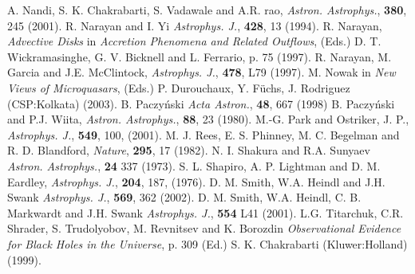 \documentclass{ws-procs975x65}
\begin{document}
\begin{thebibliography}{0}
\bibitem{} A. Nandi, S. K. Chakrabarti, S. Vadawale and A.R. rao, {\it Astron. Astrophys.}, {\bf 380}, 245 (2001).
\bibitem{} R. Narayan and I. Yi {\it Astrophys. J.}, {\bf 428}, 13 (1994).
\bibitem{} R. Narayan, {\it Advective Disks} in {\it Accretion Phenomena and Related Outflows}, (Eds.) D. T. Wickramasinghe, G. V. Bicknell and L. Ferrario, p. 75  (1997).
\bibitem{} R. Narayan, M. Garcia and J.E. McClintock, {\it Astrophys. J.}, {\bf 478}, L79 (1997).
\bibitem{} M. Nowak in {\it New Views of Microquasars}, (Eds.) P. Durouchaux, Y. F\"uchs, J. Rodriguez (CSP:Kolkata) (2003).
\bibitem{} B. Paczy\'nski {\it Acta Astron.}, {\bf 48}, 667 (1998)
\bibitem{} B. Paczy\'nski and P.J. Wiita, {\it Astron. Astrophys.}, {\bf 88}, 23 (1980).
\bibitem{} M.-G. Park and Ostriker, J. P.,  {\it Astrophys. J.}, {\bf 549}, 100, (2001).
\bibitem{} M. J. Rees, E. S. Phinney, M. C. Begelman and R. D. Blandford, {\it Nature}, {\bf 295}, 17 (1982).
\bibitem{} N. I. Shakura and R.A. Sunyaev {\it Astron. Astrophys.}, {\bf 24} 337 (1973).
\bibitem{} S. L. Shapiro, A. P. Lightman and D. M. Eardley,  {\it Astrophys. J.}, {\bf 204}, 187, (1976).
\bibitem{} D. M. Smith, W.A. Heindl and J.H. Swank {\it Astrophys. J.}, {\bf 569}, 362 (2002).
\bibitem{} D. M. Smith, W.A. Heindl, C. B. Markwardt and J.H. Swank {\it Astrophys. J.}, {\bf 554} L41 (2001).
\bibitem{} L.G. Titarchuk, C.R. Shrader, S. Trudolyobov, M. Revnitsev and K. Borozdin {\it Observational
Evidence for Black Holes in the Universe}, p. 309 (Ed.) S. K. Chakrabarti (Kluwer:Holland) (1999).
\end{thebibliography}
\end{document}
